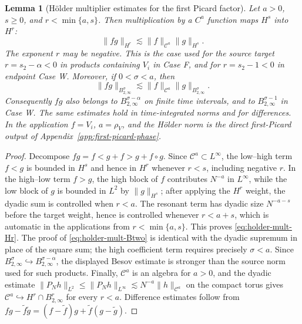 \documentclass[10pt]{amsart}
\numberwithin{equation}{section}
\theoremstyle{plain}
\newtheorem{lemma}[theorem]{Lemma}
\theoremstyle{definition}
\theoremstyle{remark}
\newcommand{\C}{\mathcal{C}}
\begin{document}
\begin{lemma}[H\"older multiplier estimates for the first Picard factor]\label{lem:positive-holder-multiplier}
Let $a>0$, $s\ge0$, and $r<\min\{a,s\}$.  Then multiplication by a $C^a$ function maps $H^s$ into $H^r$:
\begin{equation}\label{eq:holder-mult-Hr}
        \|fg\|_{H^r}\lesssim \|f\|_{\C^a}\|g\|_{H^s}.
\end{equation}
The exponent $r$ may be negative.  This is the case used for the source target $r=s_2-\alpha<0$ in products containing $V_i$ in Case F, and for $r=s_2-1<0$ in endpoint Case W.  Moreover, if $0<\sigma<a$, then
\begin{equation}\label{eq:holder-mult-Btwo}
        \|fg\|_{B_{2,\infty}^{\sigma}}
        \lesssim \|f\|_{\C^a}\|g\|_{B_{2,\infty}^{\sigma}}.
\end{equation}
Consequently $fg$ also belongs to $B_{2,\infty}^{\sigma-\alpha}$ on finite time intervals, and to $B_{2,\infty}^{\sigma-1}$ in Case W.  The same estimates hold in time-integrated norms and for differences.  In the application $f=V_i$, $a=\rho_V$, and the H\"older norm is the direct first-Picard output of Appendix~\ref{app:first-picard-phase}.
\end{lemma}

\begin{proof}
Decompose $fg=f<g+f>g+f\circ g$.  Since $\C^a\subset L^\infty$, the low--high term $f<g$ is bounded in $H^s$ and hence in $H^r$ whenever $r<s$, including negative $r$.  In the high--low term $f>g$, the high block of $f$ contributes $N^{-a}$ in $L^\infty$, while the low block of $g$ is bounded in $L^2$ by $\|g\|_{H^s}$; after applying the $H^r$ weight, the dyadic sum is controlled when $r<a$.  The resonant term has dyadic size $N^{-a-s}$ before the target weight, hence is controlled whenever $r<a+s$, which is automatic in the applications from $r<\min\{a,s\}$.  This proves \eqref{eq:holder-mult-Hr}.  The proof of \eqref{eq:holder-mult-Btwo} is identical with the dyadic supremum in place of the square sum; the high coefficient term requires precisely $\sigma<a$.  Since $B_{2,\infty}^{\sigma}\hookrightarrow B_{2,\infty}^{\sigma-\alpha}$, the displayed Besov estimate is stronger than the source norm used for such products.  Finally, $\C^a$ is an algebra for $a>0$, and the dyadic estimate $\|P_Nh\|_{L^2}\le \|P_Nh\|_{L^\infty}\lesssim N^{-a}\|h\|_{\C^a}$ on the compact torus gives $\C^a\hookrightarrow H^r\cap B_{2,\infty}^r$ for every $r<a$.  Difference estimates follow from $fg-\widetilde f\widetilde g=(f-\widetilde f)g+\widetilde f(g-\widetilde g)$.
\end{proof}
\end{document}
